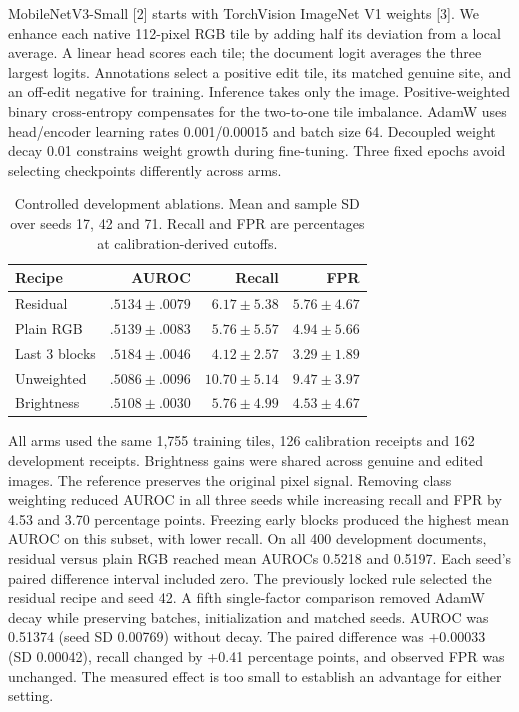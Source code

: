 \documentclass[conference]{IEEEtran}
\begin{document}
MobileNetV3-Small [2] starts with TorchVision ImageNet V1 weights [3]. We enhance each native 112-pixel RGB tile by adding half its deviation from a local average. A linear head scores each tile; the document logit averages the three largest logits. Annotations select a positive edit tile, its matched genuine site, and an off-edit negative for training. Inference takes only the image. Positive-weighted binary cross-entropy compensates for the two-to-one tile imbalance. AdamW uses head/encoder learning rates 0.001/0.00015 and batch size 64. Decoupled weight decay 0.01 constrains weight growth during fine-tuning. Three fixed epochs avoid selecting checkpoints differently across arms.

\begin{table}[t]
\caption{Controlled development ablations. Mean and sample SD over seeds 17, 42 and 71. Recall and FPR are percentages at calibration-derived cutoffs.}
\centering\footnotesize
\begin{tabular}{lrrr}
\toprule Recipe & AUROC & Recall & FPR \\ \midrule
Residual & $.5134\pm.0079$ & $6.17\pm5.38$ & $5.76\pm4.67$ \\
Plain RGB & $.5139\pm.0083$ & $5.76\pm5.57$ & $4.94\pm5.66$ \\
Last 3 blocks & $.5184\pm.0046$ & $4.12\pm2.57$ & $3.29\pm1.89$ \\
Unweighted & $.5086\pm.0096$ & $10.70\pm5.14$ & $9.47\pm3.97$ \\
Brightness & $.5108\pm.0030$ & $5.76\pm4.99$ & $4.53\pm4.67$ \\
\bottomrule
\end{tabular}
\end{table}

All arms used the same 1,755 training tiles, 126 calibration receipts and 162 development receipts. Brightness gains were shared across genuine and edited images. The reference preserves the original pixel signal. Removing class weighting reduced AUROC in all three seeds while increasing recall and FPR by 4.53 and 3.70 percentage points. Freezing early blocks produced the highest mean AUROC on this subset, with lower recall. On all 400 development documents, residual versus plain RGB reached mean AUROCs 0.5218 and 0.5197. Each seed's paired difference interval included zero. The previously locked rule selected the residual recipe and seed 42.
A fifth single-factor comparison removed AdamW decay while preserving batches, initialization and matched seeds. AUROC was 0.51374 (seed SD 0.00769) without decay. The paired difference was +0.00033 (SD 0.00042), recall changed by +0.41 percentage points, and observed FPR was unchanged. The measured effect is too small to establish an advantage for either setting.
\end{document}
